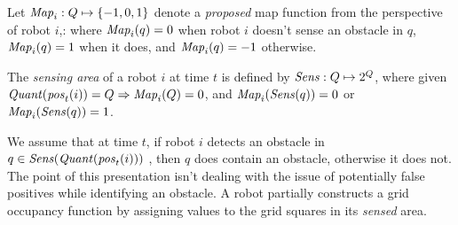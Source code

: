  Let $\mathit{Map}_i:Q\mapsto \left\{-1,0,1\right\}$ denote a \emph{proposed} map function from the perspective of robot $i$,: where $\mathit{Map}_i(q) = 0$ when robot $i$ doesn't sense an obstacle in $q$, $\mathit{Map}_i(q) = 1$ when it does, and $\mathit{Map}_i(q) = -1$ otherwise. 
 \begin{definition} The \emph{sensing area} of a robot $i$ at time $t$ is defined by $\mathit{Sens}: Q \mapsto 2^{Q}$, where given $\mathit{Quant}(\mathit{pos}_t(i)) = Q \Rightarrow \mathit{Map}_i(Q) = 0$, and  $\mathit{Map}_i(\mathit{Sens}(q)) = 0$ or $\mathit{Map}_i(\mathit{Sens}(q)) = 1$. 
  \end{definition}
  
  
We assume that at time $t$, if robot $i$ detects an obstacle in $q \in \mathit{Sens}(\mathit{Quant}(\mathit{pos}_t(i)))$ , then $q$ does contain an obstacle, otherwise it does not. The point of this presentation isn't dealing with the issue of potentially false positives while identifying an obstacle. A robot partially constructs a grid occupancy function by assigning values to the grid squares in its \emph{sensed} area.

